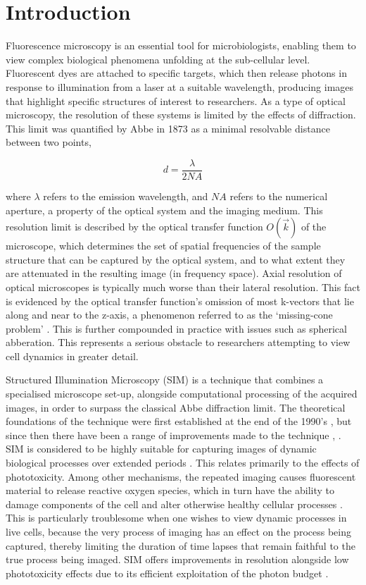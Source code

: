 \documentclass[12pt]{article}
\newcommand\NA{\mathit{NA}}
\begin{document}
\newpage
\tableofcontents

\newpage
{}
\section{Introduction}

Fluorescence microscopy is an essential tool for microbiologists,
enabling them to view complex biological phenomena unfolding at the sub-cellular level.
Fluorescent dyes are attached to specific targets,
which then release photons in response to illumination from a laser at a suitable wavelength,
producing images that highlight specific structures of interest to researchers.
As a type of optical microscopy, the resolution of these systems is limited by the effects of diffraction.
This limit was quantified by Abbe \cite{abbe} in 1873 as a minimal resolvable distance between two points,

\[d=\frac{\lambda}{2\NA}\]

where $\lambda$ refers to the emission wavelength, and $\NA$ refers to the numerical aperture,
a property of the optical system and the imaging medium.
This resolution limit is described by the optical transfer function $O(\vec{k})$ of the microscope,
which determines the set of spatial frequencies of the sample structure that can be captured by the optical system,
and to what extent they are attenuated in the resulting image (in frequency space).
Axial resolution of optical microscopes is typically much worse than their lateral resolution.
This fact is evidenced by the optical transfer function's omission of most k-vectors that lie along and near to the z-axis,
a phenomenon referred to as the `missing-cone problem' \cite{missingcone}.
This is further compounded in practice with issues such as spherical abberation.
This represents a serious obstacle to researchers attempting to view cell dynamics in greater detail.

Structured Illumination Microscopy (SIM) is a technique that combines a specialised microscope set-up,
alongside computational processing of the acquired images,
in order to surpass the classical Abbe diffraction limit.
The theoretical foundations of the technique were first established at the end of the 1990's \cite{SIM2000},
but since then there have been a range of improvements made to the technique \cite{simalgorithms}, \cite{simreview}.
SIM is considered to be highly suitable for capturing images of dynamic biological processes over extended periods \cite{simreview}.
This relates primarily to the effects of phototoxicity.
Among other mechanisms, the repeated imaging causes fluorescent material to release reactive oxygen species,
which in turn have the ability to damage components of the cell and alter otherwise healthy cellular processes \cite{phototoxicity}.
This is particularly troublesome when one wishes to view dynamic processes in live cells,
because the very process of imaging has an effect on the process being captured,
thereby limiting the duration of time lapses that remain faithful to the true process being imaged.
SIM offers improvements in resolution alongside low phototoxicity effects due to its efficient exploitation of the photon budget \cite{simreview}.
\end{document}

